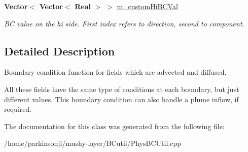 \begin{DoxyCompactItemize}
\mbox{\label{class_advect_diffuse_scalar_b_c_a5733082dd61f2021d755cfebda84481d}} 
\textbf{ Vector}$<$ \textbf{ Vector}$<$ \textbf{ Real} $>$ $>$ \hyperlink{class_advect_diffuse_scalar_b_c_a5733082dd61f2021d755cfebda84481d}{m\+\_\+custom\+Hi\+B\+C\+Val}
\begin{DoxyCompactList}\small\item\em BC value on the hi side. First index refers to direction, second to component. \end{DoxyCompactList}\end{DoxyCompactItemize}


\subsection{Detailed Description}
Boundary condition function for fields which are advected and diffused. 

All these fields have the same type of conditions at each boundary, but just different values. This boundary condition can also handle a plume inflow, if required. 

The documentation for this class was generated from the following file\+:\begin{DoxyCompactItemize}
\item 
/home/parkinsonjl/mushy-\/layer/\+B\+Cutil/Phys\+B\+C\+Util.\+cpp\end{DoxyCompactItemize}
